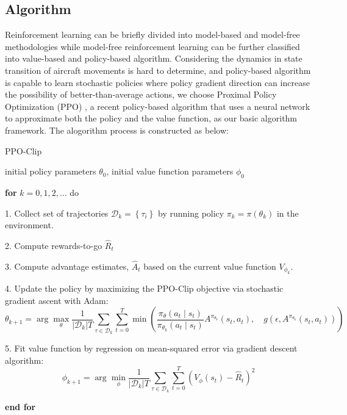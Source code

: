 \subsection{Algorithm}
Reinforcement learning can be briefly divided into model-based and model-free methodologies while model-free reinforcement learning can be further classified into value-based and policy-based algorithm. Considering the dynamics in state transition of aircraft movements is hard to determine, and policy-based algorithm is capable to learn stochastic policies where policy gradient direction can increase the possibility of better-than-average actions, we choose Proximal Policy Optimization (PPO) \citep{schulman2017proximal}, a recent policy-based algorithm that uses a neural network to approximate both the policy and the value function, as our basic algorithm framework. The alogorithm process is constructed as below: 
\begin{algorithm}[H]
    \caption{PPO-Clip}
    \begin{algorithmic}[1]
        \REQUIRE
        initial policy parameters $\theta_{0}$, initial value function parameters $\phi_{0}$
        
        \textbf{for} $k=0,1,2, \ldots$ do
        
        1. Collect set of trajectories $\mathcal{D}_{k}=\left\{\tau_{i}\right\}$ by running policy $\pi_{k}=\pi\left(\theta_{k}\right)$ in the environment.

        2. Compute rewards-to-go $\hat{R}_{t}$

        3. Compute advantage estimates, $\hat{A}_{t}$ based on the current value function $V_{\phi_{k}}$.

        4. Update the policy by maximizing the PPO-Clip objective via stochastic gradient ascent with Adam:
$$
\theta_{k+1}=\arg \max _{\theta} \frac{1}{\left|\mathcal{D}_{k}\right| T} \sum_{\tau \in \mathcal{D}_{k}} \sum_{t=0}^{T} \min \left(\frac{\pi_{\theta}\left(a_{t} \mid s_{t}\right)}{\pi_{\theta_{k}}\left(a_{t} \mid s_{t}\right)} A^{\pi_{\theta_{k}}}\left(s_{t}, a_{t}\right), \quad g\left(\epsilon, A^{\pi_{\theta_{k}}}\left(s_{t}, a_{t}\right)\right)\right)
$$

5. Fit value function by regression on mean-squared error via gradient descent algorithm:
$$
\phi_{k+1}=\arg \min _{\phi} \frac{1}{\left|\mathcal{D}_{k}\right| T} \sum_{\tau \in \mathcal{D}_{k}} \sum_{t=0}^{T}\left(V_{\phi}\left(s_{t}\right)-\hat{R}_{t}\right)^{2}
$$

\textbf{end for}   
    \end{algorithmic}
\end{algorithm}
